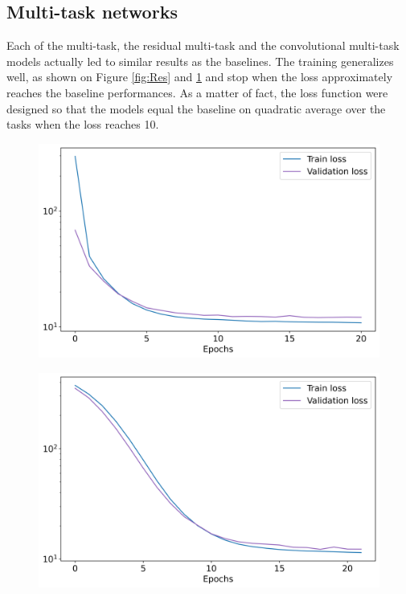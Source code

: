 \documentclass{article}
\begin{document}
\subsection*{Multi-task networks}

Each of the multi-task, the residual multi-task and the convolutional multi-task models actually
led to similar results as the baselines. The training generalizes well,
as shown on Figure \ref{fig:Res} and \ref{fig:Conv} and stop
when the loss approximately reaches the baseline performances.
As a matter of fact, the loss function were designed so that the models equal the baseline on quadratic average
over the tasks when the loss reaches 10.

\begin{figure}[H]
\centering
\begin{minipage}{.5\textwidth}
	\centering
	\includegraphics[width=.95\linewidth]{img/restrain.png}
	\label{fig:Res}
\end{minipage}%
\begin{minipage}{.5\textwidth}
	\centering
	\includegraphics[width=.95\linewidth]{img/convtrain.png}
	\label{fig:Conv}
\end{minipage}
\end{figure}
\end{document}
